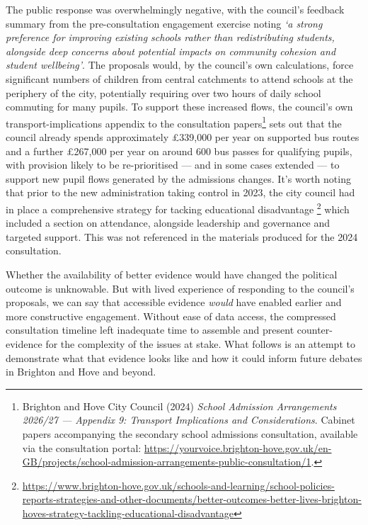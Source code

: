 \documentclass[
  12pt,
  titlepage]{article}
\begin{document}
The public response was overwhelmingly negative, with the council's
feedback summary from the pre-consultation engagement exercise noting
\emph{`a strong preference for improving existing schools rather than
redistributing students, alongside deep concerns about potential impacts
on community cohesion and student wellbeing'}. The proposals would, by
the council's own calculations, force significant numbers of children
from central catchments to attend schools at the periphery of the city,
potentially requiring over two hours of daily school commuting for many
pupils. To support these increased flows, the council's own
transport-implications appendix to the consultation papers\footnote{Brighton
  and Hove City Council (2024) \emph{School Admission Arrangements
  2026/27 --- Appendix 9: Transport Implications and Considerations}.
  Cabinet papers accompanying the secondary school admissions
  consultation, available via the consultation portal:
  \url{https://yourvoice.brighton-hove.gov.uk/en-GB/projects/school-admission-arrangements-public-consultation/1}.}
sets out that the council already spends approximately £339,000 per year
on supported bus routes and a further £267,000 per year on around 600
bus passes for qualifying pupils, with provision likely to be
re-prioritised --- and in some cases extended --- to support new pupil
flows generated by the admissions changes. It's worth noting that prior
to the new administration taking control in 2023, the city council had
in place a comprehensive strategy for tacking educational disadvantage
\footnote{\url{https://www.brighton-hove.gov.uk/schools-and-learning/school-policies-reports-strategies-and-other-documents/better-outcomes-better-lives-brighton-hoves-strategy-tackling-educational-disadvantage}}
which included a section on attendance, alongside leadership and
governance and targeted support. This was not referenced in the
materials produced for the 2024 consultation.

Whether the availability of better evidence would have changed the
political outcome is unknowable. But with lived experience of responding
to the council's proposals, we can say that accessible evidence
\emph{would} have enabled earlier and more constructive engagement.
Without ease of data access, the compressed consultation timeline left
inadequate time to assemble and present counter-evidence for the
complexity of the issues at stake. What follows is an attempt to
demonstrate what that evidence looks like and how it could inform future
debates in Brighton and Hove and beyond.
\end{document}

